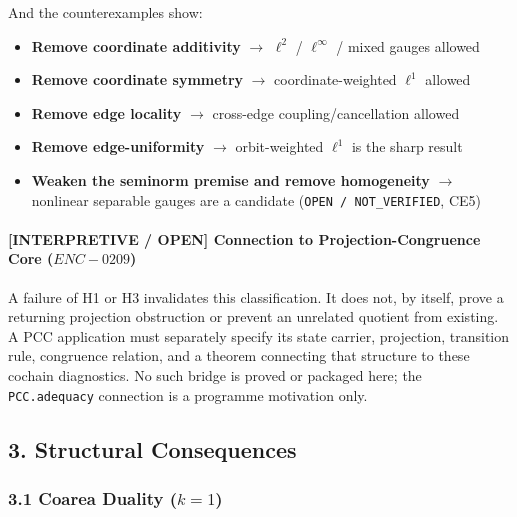 \documentclass[
  11pt,
]{article}
\begin{document}
And the counterexamples show:

\begin{itemize}
\item
  \textbf{Remove coordinate additivity} \(\to\) \(\ell^2\) /
  \(\ell^\infty\) / mixed gauges allowed
\item
  \textbf{Remove coordinate symmetry} \(\to\) coordinate-weighted
  \(\ell^1\) allowed
\item
  \textbf{Remove edge locality} \(\to\) cross-edge coupling/cancellation
  allowed
\item
  \textbf{Remove edge-uniformity} \(\to\) orbit-weighted \(\ell^1\) is
  the sharp result
\item
  \textbf{Weaken the seminorm premise and remove homogeneity} \(\to\)
  nonlinear separable gauges are a candidate
  (\texttt{OPEN /\allowbreak{} NOT\_\allowbreak{}VERIFIED}, CE5)
\end{itemize}

\hypertarget{interpretive-open-connection-to-projection-congruence-core-enc-0209}{%
\paragraph{\texorpdfstring{\textbf{{[}INTERPRETIVE / OPEN{]} Connection
to Projection-Congruence Core
(\(ENC-0209\))}}{{[}INTERPRETIVE / OPEN{]} Connection to Projection-Congruence Core (ENC-0209)}}\label{interpretive-open-connection-to-projection-congruence-core-enc-0209}}

A failure of H1 or H3 invalidates this classification. It does not, by
itself, prove a returning projection obstruction or prevent an unrelated
quotient from existing. A PCC application must separately specify its
state carrier, projection, transition rule, congruence relation, and a
theorem connecting that structure to these cochain diagnostics. No such
bridge is proved or packaged here; the \texttt{PCC.adequacy} connection
is a programme motivation only.

\hypertarget{structural-consequences}{%
\subsection{3. Structural Consequences}\label{structural-consequences}}

\hypertarget{coarea-duality-k-1}{%
\subsubsection{\texorpdfstring{3.1 Coarea Duality
(\(k = 1\))}{3.1 Coarea Duality (k = 1)}}\label{coarea-duality-k-1}}
\end{document}
